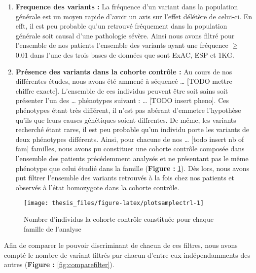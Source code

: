 \documentclass[12pt,twoside]{reedthesis}
\providecommand{\tightlist}{%
  \setlength{\itemsep}{0pt}\setlength{\parskip}{0pt}}
\theoremstyle{definition}
\theoremstyle{definition}
\theoremstyle{remark}
\begin{document}
  \begin{enumerate}
  \def\labelenumi{\arabic{enumi}.}
  \setcounter{enumi}{4}
  \tightlist
  \item
    \textbf{Frequence des variants :} La fréquence d'un variant dans la
    population générale est un moyen rapide d'avoir un avis sur l'effet
    délétère de celui-ci. En efft, il est peu probable qu'un retrouvé
    fréquement dans la population générale soit causal d'une pathologie
    sévère. Ainsi nous avons filtré pour l'ensemble de nos patients
    l'ensemble des variants ayant une fréquence \(\ge\) 0.01 dans l'une
    des trois bases de données que sont ExAC, ESP et 1KG.\\
  \item
    \textbf{Présence des variants dans la cohorte contrôle :} Au cours de
    nos différentes études, nous avons été ammené à séquencé \ldots{}
    {[}TODO mettre chiffre exacte{]}. L'ensemble de ces individus peuvent
    être soit sains soit présenter l'un des \ldots{} phénotypes suivant :
    \ldots{} {[}TODO insert pheno{]}. Ces phénotypes étant très différent,
    il n'est pas abérant d'emmetre l'hypothèse qu'ils que leurs causes
    génétiques soient diffrentes. De même, les variants recherché étant
    rares, il est peu probable qu'un individu porte les variants de deux
    phénotypes différents. Ainsi, pour chacune de nos \ldots{} {[}todo
    insert nb of fam{]} familles, nous avons pu constituer une cohorte
    contrôle composée dans l'ensemble des patients précédemment analysés
    et ne présentant pas le même phénotype que celui étudié dans la
    famille (\textbf{Figure : }\ref{fig:plotsamplectrl}). Dès lors, nous
    avons put filtrer l'ensemble des variants retrouvés à la fois chez nos
    patients et observés à l'état homozygote dans la cohorte contrôle.
  \end{enumerate}
  
  \begin{figure}
  
  {\centering \texttt{[image: thesis\_files/figure-latex/plotsamplectrl-1]} 
  
  }
  
  \caption[Nombre d'individus la cohorte contrôle constituée pour chaque famille de l'analyse]{Nombre d'individus la cohorte contrôle constituée pour chaque famille de l'analyse}\label{fig:plotsamplectrl}
  \end{figure}
  
  Afin de comparer le pouvoir discriminant de chacun de ces filtres, nous
  avons compté le nombre de variant filtrés par chacun d'entre eux
  indépendamments des autres (\textbf{Figure : }\ref{fig:comparefilter}).
  
\end{document}
